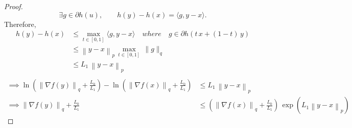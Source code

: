 \documentclass{article}
\newcommand{\norm}[1]{\left\|#1 \right\|}
\begin{document}
\begin{proof}
\[
\exists g\in \partial h(u), \qquad h(y)-h(x)=\langle g,y-x\rangle.
\]
Therefore,
\begin{align*}
h(y) - h(x) &\leq \max_{t\in[0,1]}  \langle g,y-x\rangle \quad {where} \quad g \in \partial h(t \, x + (1-t) \, y) \\
& \leq \norm{y - x}_p \, \max_{t\in[0,1]}\,\|g\|_q
 \tag{Using Holder's inequality} \\
& \leq L_1 \, \norm{y - x}_p   \tag{Using the above bound on the subgradient} \\
\end{align*}
\begin{align*}
\implies \ln(\norm{\nabla f(y)}_q  + \frac{L_0}{L_1}) - \ln(\norm{\nabla f(x)}_q  + \frac{L_0}{L_1}) & \leq  L_1 \, \norm{y - x}_p  \\
\implies \norm{\nabla f(y)}_q  +\frac{L_0}{L_1} & \leq \left(\norm{\nabla f(x)}_q  + \frac{L_0}{L_1} \right) \, \exp\left(L_1 \norm{y - x}_p\right) 
\end{align*}
\end{proof}
\end{document}
